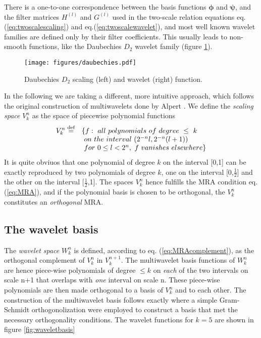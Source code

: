 \noindent
There is a one-to-one correspondence between the basis functions
$\boldsymbol{\phi}$ and $\boldsymbol{\psi}$, and the filter matrices $H^{(l)}$ 
and $G^{(l)}$ used in the two-scale relation equations eq.
(\ref{eq:twoscalescaling}) and eq.(\ref{eq:twoscalewavelet}), and most well known 
wavelet families are defined only by their filter coefficients. This usually 
leads to non-smooth functions, like the Daubechies $D_2$ wavelet family (figure
\ref{fig:daubechies}).\\

\begin{figure}
	\centering
	\texttt{[image: figures/daubechies.pdf]}
	\caption{Daubechies $D_2$ scaling (left) and wavelet (right) function.}
	\label{fig:daubechies}
\end{figure}

\noindent
In the following we are taking a different, more intuitive approach, which
follows the original construction of multiwavelets done by Alpert
\cite{Alpert93}. We define the \emph{scaling space} $V^n_k$ as the space of 
piecewise polynomial functions
\begin{equation}
	\begin{array}{rl}
		\displaystyle V^n_k \mydef & \lbrace f:\ all\ polynomials\ of\ 
													degree\ \leq\ k\\ 
	\displaystyle &\ on\ the\ interval\ (2^{-n}l,2^{-n}(l+1))\\
	\displaystyle &\ for\ 0 \leq l < 2^n,\ f\ vanishes\ elsewhere \rbrace
	\end{array}
\end{equation}
It is quite obviuos that one polynomial of degree $k$ on the interval [0,1] 
can be exactly reproduced by two polynomials of degree $k$, one on the 
interval [0,$\frac{1}{2}$] and the other on the interval [$\frac{1}{2}$,1]. The
spaces $V^n_k$ hence fulfills the MRA condition eq.(\ref{eq:MRA}), and if the 
polynomial basis is chosen to be orthogonal, the $V^n_k$ constitutes an 
\emph{orthogonal} MRA.\\

\subsection{The wavelet basis}
The \emph{wavelet space} $W^n_k$ is defined, according to eq.
(\ref{eq:MRAcomplement}), as the orthogonal complement of $V^n_k$ in 
$V^{n+1}_k$. The multiwavelet basis functions of $W^n_k$ are hence piece-wise
polynomials of degree $\leq k$ on \emph{each} of the two intervals on scale n+1 
that overlaps with \emph{one} interval on scale n. These piece-wise polynomials
are then made orthogonal to a basis of $V^n_k$ and to each other. The 
construction of the multiwavelet basis follows exactly \cite{Alpert93} where 
a simple Gram-Schmidt orthogonolization were employed to construct a basis that
met the necessary orthogonality conditions. The wavelet functions for $k=5$ are
shown in figure \ref{fig:waveletbasis}\\

